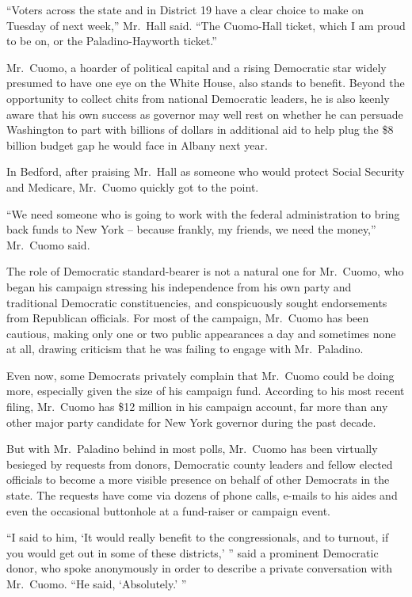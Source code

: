 ﻿\documentclass[12pt]{article}
\begin{document}
``Voters across the state and in District 19 have a clear choice to make on Tuesday of next week,''
Mr.~Hall said. ``The Cuomo-Hall ticket, which I am proud to be on, or the Paladino-Hayworth
ticket.''

Mr.~Cuomo, a hoarder of political capital and a rising Democratic star widely presumed to have one
eye on the White House, also stands to benefit. Beyond the opportunity to collect chits from
national Democratic leaders, he is also keenly aware that his own success as governor may well rest
on whether he can persuade Washington to part with billions of dollars in additional aid to help
plug the \$8 billion budget gap he would face in Albany next year.

In Bedford, after praising Mr.~Hall as someone who would protect Social Security and Medicare,
Mr.~Cuomo quickly got to the point.

``We need someone who is going to work with the federal administration to bring back funds to New
York -- because frankly, my friends, we need the money,'' Mr.~Cuomo said.

The role of Democratic standard-bearer is not a natural one for Mr.~Cuomo, who began his campaign
stressing his independence from his own party and traditional Democratic constituencies, and
conspicuously sought endorsements from Republican officials. For most of the campaign, Mr.~Cuomo has
been cautious, making only one or two public appearances a day and sometimes none at all, drawing
criticism that he was failing to engage with Mr.~Paladino.

Even now, some Democrats privately complain that Mr.~Cuomo could be doing more, especially given the
size of his campaign fund. According to his most recent filing, Mr.~Cuomo has \$12 million in his
campaign account, far more than any other major party candidate for New York governor during the
past decade.

But with Mr.~Paladino behind in most polls, Mr.~Cuomo has been virtually besieged by requests from
donors, Democratic county leaders and fellow elected officials to become a more visible presence on
behalf of other Democrats in the state. The requests have come via dozens of phone calls, e-mails to
his aides and even the occasional buttonhole at a fund-raiser or campaign event.

``I said to him, `It would really benefit to the congressionals, and to turnout, if you would get
out in some of these districts,' '' said a prominent Democratic donor, who spoke anonymously in
order to describe a private conversation with Mr.~Cuomo. ``He said, `Absolutely.' ''
\end{document}
